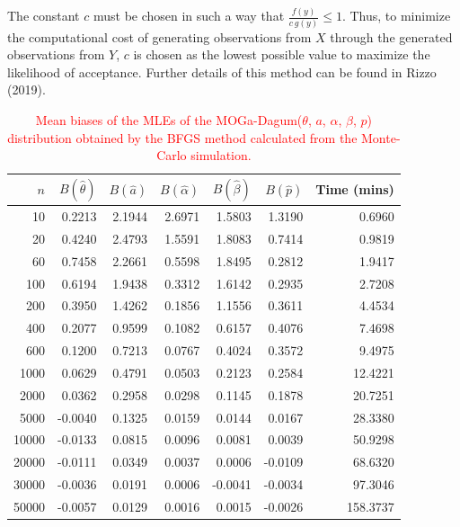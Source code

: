\documentclass[twoside,leqno,11pt]{article}
\begin{document}
The constant $c$ must be chosen in such a way that $\frac{f(y)}{c \,g (y)}\leq 1 $. 
Thus, to minimize the computational cost of generating observations from $X$ through the generated observations from $Y$, $c$ is chosen 
as the lowest possible value to maximize the likelihood of acceptance. Further details of this method can be found in Rizzo (2019).

\begin{table}[H]
	\centering
	\caption{\textcolor{red}{Mean biases of the MLEs of the MOGa-Dagum($\theta$, $a$, $\alpha$, $\beta$, $p$) distribution obtained by the BFGS method calculated from the Monte-Carlo simulation.}}\label{tab:bias1}
	\begin{tabular}{rrrrrrr}
		\hline
		$n$ & $B(\hat{\theta})$ & $B(\hat{a})$ & $B(\hat{\alpha})$ & $B(\hat{\beta})$ & $B(\hat{p})$ & Time (mins)\\
		\hline
10 & 0.2213 & 2.1944 & 2.6971 & 1.5803 & 1.3190 & 0.6960 \\ 
20 & 0.4240 & 2.4793 & 1.5591 & 1.8083 & 0.7414 & 0.9819 \\ 
60 & 0.7458 & 2.2661 & 0.5598 & 1.8495 & 0.2812 & 1.9417 \\ 
100 & 0.6194 & 1.9438 & 0.3312 & 1.6142 & 0.2935 & 2.7208 \\ 
200 & 0.3950 & 1.4262 & 0.1856 & 1.1556 & 0.3611 & 4.4534 \\ 
400 & 0.2077 & 0.9599 & 0.1082 & 0.6157 & 0.4076 & 7.4698 \\ 
600 & 0.1200 & 0.7213 & 0.0767 & 0.4024 & 0.3572 & 9.4975 \\ 
1000 & 0.0629 & 0.4791 & 0.0503 & 0.2123 & 0.2584 & 12.4221 \\ 
2000 & 0.0362 & 0.2958 & 0.0298 & 0.1145 & 0.1878 & 20.7251 \\ 
5000 & -0.0040 & 0.1325 & 0.0159 & 0.0144 & 0.0167 & 28.3380 \\ 
10000 & -0.0133 & 0.0815 & 0.0096 & 0.0081 & 0.0039 & 50.9298 \\ 
20000 & -0.0111 & 0.0349 & 0.0037 & 0.0006 & -0.0109 & 68.6320 \\ 
30000 & -0.0036 & 0.0191 & 0.0006 & -0.0041 & -0.0034 & 97.3046 \\ 
50000 & -0.0057 & 0.0129 & 0.0016 & 0.0015 & -0.0026 & 158.3737 \\ 
		\hline
	\end{tabular}
\end{table}
\end{document}
